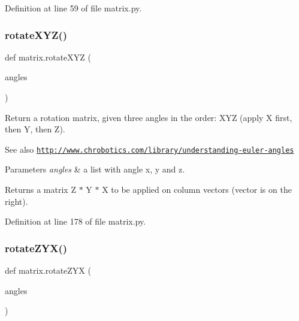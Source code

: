 Definition at line 59 of file matrix.\+py.

\mbox{\label{namespacematrix_a6ec9bcea96b6f86fa8310972f553868e}} 
\subsubsection{\texorpdfstring{rotate\+X\+Y\+Z()}{rotateXYZ()}}
{\footnotesize\ttfamily def matrix.\+rotate\+X\+YZ (\begin{DoxyParamCaption}\item[{}]{angles }\end{DoxyParamCaption})}



Return a rotation matrix, given three angles in the order\+: X\+YZ (apply X first, then Y, then Z). 

\begin{DoxySeeAlso}{See also}
\href{http://www.chrobotics.com/library/understanding-euler-angles}{\tt http\+://www.\+chrobotics.\+com/library/understanding-\/euler-\/angles} 
\end{DoxySeeAlso}

\begin{DoxyParams}{Parameters}
{\em angles} & a list with angle x, y and z. \\
\hline
\end{DoxyParams}
\begin{DoxyReturn}{Returns}
a matrix Z $\ast$ Y $\ast$ X to be applied on column vectors (vector is on the right). 
\end{DoxyReturn}


Definition at line 178 of file matrix.\+py.

\mbox{\label{namespacematrix_a6f88dcffb304ec9fabe5f5c7dfafa836}} 
\subsubsection{\texorpdfstring{rotate\+Z\+Y\+X()}{rotateZYX()}}
{\footnotesize\ttfamily def matrix.\+rotate\+Z\+YX (\begin{DoxyParamCaption}\item[{}]{angles }\end{DoxyParamCaption})}




